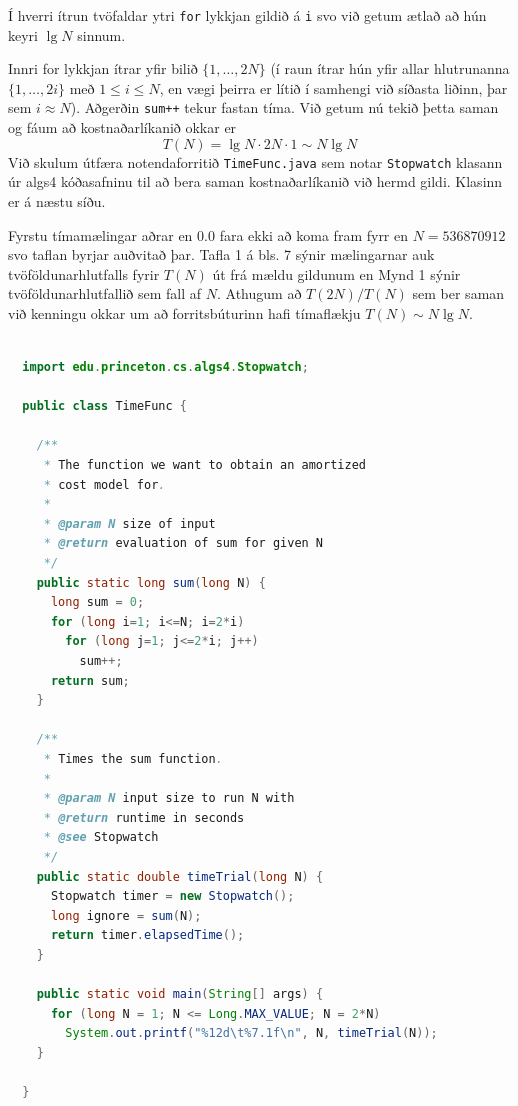 \documentclass[a4paper, 12pt]{article}
\begin{document}
\noindent
Í hverri ítrun tvöfaldar ytri \texttt{for} lykkjan
gildið á \texttt i svo við getum ætlað að hún keyri $\lg N$ sinnum.

Innri for lykkjan ítrar yfir bilið $\{1, \ldots, 2N\}$ (í raun ítrar hún yfir allar hlutrunanna
$\{1, \ldots, 2i\}$ með $1 \leq i \leq N$, en vægi þeirra er lítið í samhengi við síðasta liðinn, þar
sem $i \approx N$). Aðgerðin \texttt{sum++} tekur fastan tíma. Við getum nú tekið þetta saman og fáum
að kostnaðarlíkanið okkar er
\[
T(N) = \lg N \cdot 2N \cdot 1 \sim N \lg N
\]
Við skulum útfæra notendaforritið \texttt{TimeFunc.java} sem notar \texttt{Stopwatch} klasann úr algs4 kóðasafninu til að bera saman kostnaðarlíkanið
við hermd gildi. Klasinn er á næstu síðu.

Fyrstu tímamælingar aðrar en $0.0$ fara ekki að koma fram fyrr en $N = 536870912$ svo taflan byrjar auðvitað þar. Tafla 1 á bls. 7 sýnir mælingarnar
auk tvöföldunarhlutfalls fyrir $T(N)$ út frá mældu gildunum en Mynd 1 sýnir tvöföldunarhlutfallið sem fall af $N$. Athugum að $T(2N)/T(N)$ sem ber saman
við kenningu okkar um að forritsbúturinn hafi tímaflækju $T(N) \sim N \lg N$.

\newpage
\begin{lstlisting}[language=java]

  import edu.princeton.cs.algs4.Stopwatch;

  public class TimeFunc {
  
    /**
     * The function we want to obtain an amortized
     * cost model for.
     *
     * @param N size of input
     * @return evaluation of sum for given N
     */
    public static long sum(long N) {
      long sum = 0; 
      for (long i=1; i<=N; i=2*i)
        for (long j=1; j<=2*i; j++) 
          sum++;
      return sum;
    }
  
    /**
     * Times the sum function.
     *
     * @param N input size to run N with
     * @return runtime in seconds
     * @see Stopwatch
     */
    public static double timeTrial(long N) {
      Stopwatch timer = new Stopwatch();
      long ignore = sum(N);
      return timer.elapsedTime();
    }
    
    public static void main(String[] args) {
      for (long N = 1; N <= Long.MAX_VALUE; N = 2*N) 
        System.out.printf("%12d\t%7.1f\n", N, timeTrial(N));
    }

  }
  
\end{lstlisting}

\newpage
\end{document}
